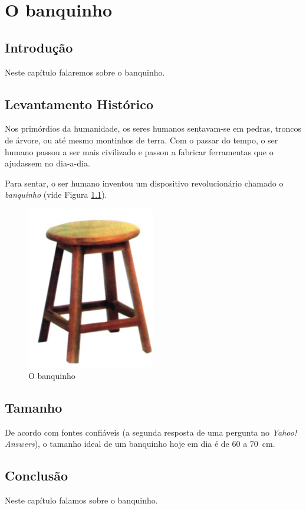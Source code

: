 \chapter{O banquinho}
\label{chap:banquinho}

\section{Introdução}

Neste capítulo falaremos sobre o banquinho.

\section{Levantamento Histórico}

Nos primórdios da humanidade, os seres humanos sentavam-se em
pedras, troncos de árvore, ou até mesmo montinhos de terra.
Com o passar do tempo, o ser humano passou a ser mais civilizado
e passou a fabricar ferramentas que o ajudassem no dia-a-dia.

Para sentar, o ser humano inventou um dispositivo revolucionário
chamado o \emph{banquinho} (vide Figura \ref{fig:banquinho}).

\begin{figure}[!htb]
  \centering
  \includegraphics[width=0.5\textwidth]{banquinho.jpg}
  \caption{O banquinho}
  \label{fig:banquinho}
\end{figure}

\section{Tamanho}

De acordo com fontes confiáveis (a segunda resposta de uma pergunta
no \textit{Yahoo! Answers}), o tamanho ideal de um banquinho hoje em
dia é de 60 a 70~cm.

\section{Conclusão}

Neste capítulo falamos sobre o banquinho.
